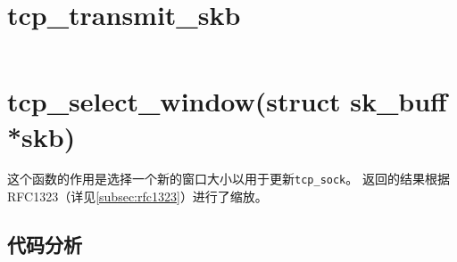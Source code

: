 \section{tcp\_transmit\_skb}

\begin{verbatim}

\end{verbatim}

\section{tcp\_select\_window(struct sk\_buff *skb)}
这个函数的作用是选择一个新的窗口大小以用于更新\texttt{tcp_sock}。
返回的结果根据RFC1323（详见\ref{subsec:rfc1323}）进行了缩放。

\subsection{代码分析}
